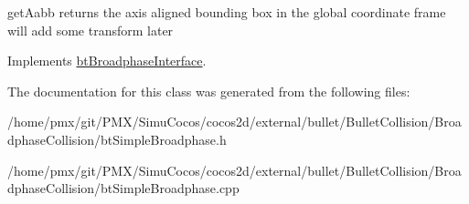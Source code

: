 get\+Aabb returns the axis aligned bounding box in the \textquotesingle{}global\textquotesingle{} coordinate frame will add some transform later 

Implements \hyperlink{classbtBroadphaseInterface_ab5af9e26414f5a72a76040b8fab4d9e2}{bt\+Broadphase\+Interface}.



The documentation for this class was generated from the following files\+:\begin{DoxyCompactItemize}
\item 
/home/pmx/git/\+P\+M\+X/\+Simu\+Cocos/cocos2d/external/bullet/\+Bullet\+Collision/\+Broadphase\+Collision/bt\+Simple\+Broadphase.\+h\item 
/home/pmx/git/\+P\+M\+X/\+Simu\+Cocos/cocos2d/external/bullet/\+Bullet\+Collision/\+Broadphase\+Collision/bt\+Simple\+Broadphase.\+cpp\end{DoxyCompactItemize}
